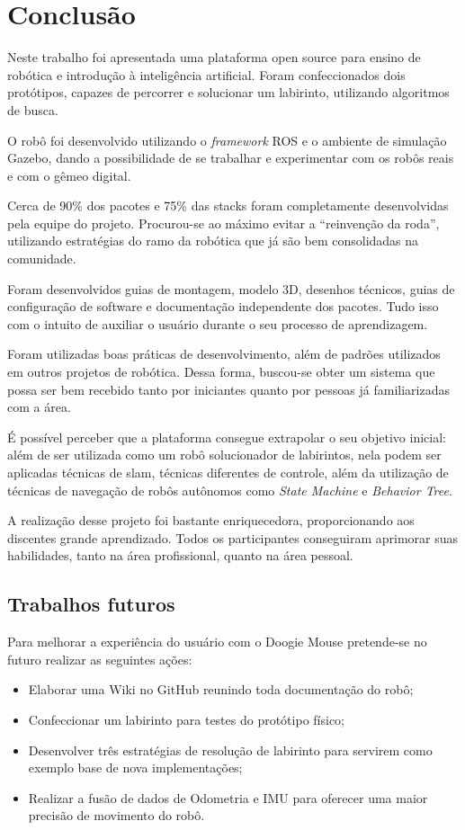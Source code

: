 \chapter{Conclusão}
\label{chap:conc}

Neste trabalho foi apresentada uma plataforma open source para ensino de robótica e introdução à inteligência artificial. Foram confeccionados dois protótipos, capazes de percorrer e solucionar um labirinto, utilizando algoritmos de busca.

O robô foi desenvolvido utilizando o \textit{framework} ROS e o ambiente de simulação Gazebo, dando a possibilidade de se trabalhar e experimentar com os robôs reais e com o gêmeo digital.

Cerca de 90\% dos pacotes e 75\% das stacks foram completamente desenvolvidas pela equipe do projeto. Procurou-se ao máximo evitar a “reinvenção da roda”, utilizando estratégias do ramo da robótica que já são bem consolidadas na comunidade.

Foram desenvolvidos guias de montagem, modelo 3D, desenhos técnicos, guias de configuração de software e documentação independente dos pacotes. Tudo isso com o intuito de auxiliar o usuário durante o seu processo de aprendizagem.

Foram utilizadas boas práticas de desenvolvimento, além de padrões utilizados em outros projetos de robótica. Dessa forma, buscou-se obter um sistema que possa ser bem recebido tanto por iniciantes quanto por pessoas já familiarizadas com a área.

É possível perceber que a plataforma consegue extrapolar o seu objetivo inicial: além de ser utilizada como um robô solucionador de labirintos, nela podem ser aplicadas técnicas de \gls*{slam}, técnicas diferentes de controle, além da utilização de técnicas de navegação de robôs autônomos como \textit{State Machine} e \textit{Behavior Tree}. 

A realização desse projeto foi bastante enriquecedora, proporcionando aos discentes grande aprendizado. Todos os participantes conseguiram aprimorar suas habilidades, tanto na área profissional, quanto na área pessoal.

\section{Trabalhos futuros}
\label{sec:trabfut}
Para melhorar a experiência do usuário com o Doogie Mouse pretende-se no futuro realizar as seguintes ações:
\begin{itemize}
	\item Elaborar uma Wiki no GitHub reunindo toda documentação do robô;
	\item Confeccionar um labirinto para testes do protótipo físico;
	\item Desenvolver três estratégias de resolução de labirinto para servirem como exemplo base de nova implementações;
	\item Realizar a fusão de dados de Odometria e IMU para oferecer uma maior precisão de movimento do robô.
\end{itemize}
 


